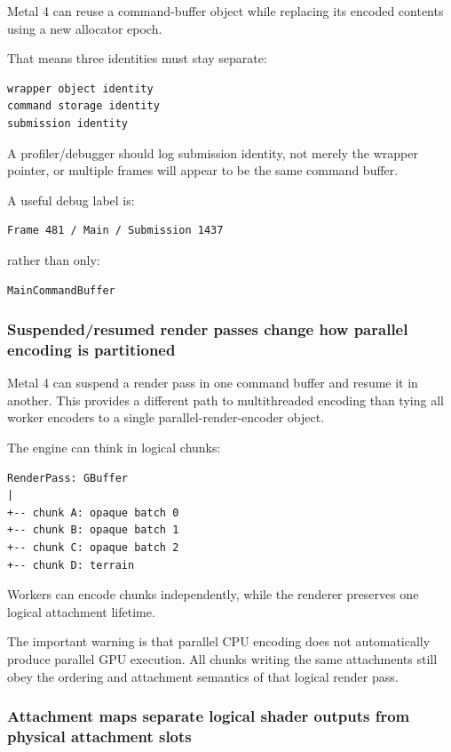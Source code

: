 Metal 4 can reuse a command-buffer object while replacing its encoded contents using a new allocator epoch.

That means three identities must stay separate:

\begin{verbatim}
wrapper object identity
command storage identity
submission identity
\end{verbatim}

A profiler/debugger should log submission identity, not merely the wrapper pointer, or multiple frames will appear to be the same command buffer.

A useful debug label is:

\begin{verbatim}
Frame 481 / Main / Submission 1437
\end{verbatim}

rather than only:

\begin{verbatim}
MainCommandBuffer
\end{verbatim}

\subsubsection{Suspended/resumed render passes change how parallel encoding is partitioned}\label{05-engine-i-ch022-suspendedresumed-render-passes-change-how-parallel-encoding-is-partitioned}

Metal 4 can suspend a render pass in one command buffer and resume it in another. This provides a different path to multithreaded encoding than tying all worker encoders to a single parallel-render-encoder object.

The engine can think in logical chunks:

\begin{verbatim}
RenderPass: GBuffer
|
+-- chunk A: opaque batch 0
+-- chunk B: opaque batch 1
+-- chunk C: opaque batch 2
+-- chunk D: terrain
\end{verbatim}

Workers can encode chunks independently, while the renderer preserves one logical attachment lifetime.

The important warning is that parallel CPU encoding does not automatically produce parallel GPU execution. All chunks writing the same attachments still obey the ordering and attachment semantics of that logical render pass.

\subsubsection{Attachment maps separate logical shader outputs from physical attachment slots}\label{05-engine-i-ch022-attachment-maps-separate-logical-shader-outputs-from-physical-attachment-slots}

